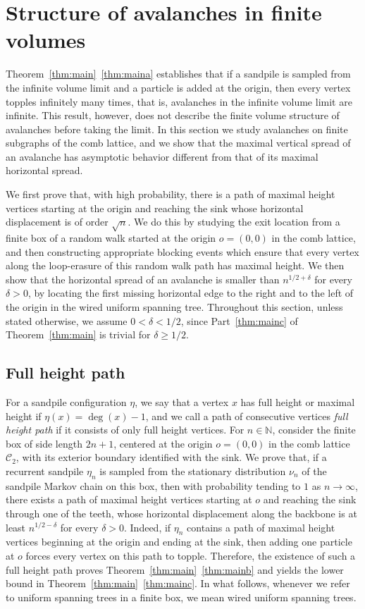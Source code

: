 \documentclass[11pt]{article}
\newcommand{\N}{\mathbb{N}}
\begin{document}
\section{Structure of avalanches in finite volumes}\label{sec:avalanche}

Theorem~\ref{thm:main}~\ref{thm:maina} establishes that if a sandpile is sampled from the infinite volume limit and a particle is added at the origin, then every vertex topples infinitely many times, that is, avalanches in the infinite volume limit are infinite. This result, however, does not describe the finite volume structure of avalanches before taking the limit. In this section we study avalanches on finite subgraphs of the comb lattice, and we show that the maximal vertical spread of an avalanche has asymptotic behavior different from that of its maximal horizontal spread.

We first prove that, with high probability, there is a path of maximal height vertices starting at the origin and reaching the sink whose horizontal displacement is of order $\sqrt{n}$. We do this by studying the exit location from a finite box of a random walk started at the origin $o=(0,0)$ in the comb lattice, and then constructing appropriate blocking events which ensure that every vertex along the loop-erasure of this random walk path has maximal height.
We then show that the horizontal spread of an avalanche is smaller than $n^{1/2+\delta}$ for every $\delta>0$, by locating the first missing horizontal edge to the right and to the left of the origin in the wired uniform spanning tree. Throughout this section, unless stated otherwise, we assume $0<\delta<1/2$, since Part~\ref{thm:mainc} of Theorem~\ref{thm:main} is trivial for $\delta\geq 1/2$.

\subsection{Full height path}\label{subsec:full-height}

For a sandpile configuration $\eta$, we say that a vertex $x$ has full height or maximal height if $\eta(x)=\deg(x)-1$, and we call a path of consecutive vertices \emph{full height path} if it consists of only full height vertices.
For $n\in \N$, consider the finite box of side length $2n+1$, centered at the origin $o=(0,0)$ in the comb lattice $\mathcal{C}_2$, with its exterior boundary identified with the sink. We prove that, if a recurrent sandpile $\eta_n$ is sampled from the stationary distribution $\nu_n$ of the sandpile Markov chain on this box, then with probability tending to $1$ as $n\to\infty$, there exists a path of maximal height vertices starting at $o$ and reaching the sink through one of the teeth, whose horizontal displacement along the backbone is at least $n^{1/2-\delta}$ for every $\delta>0$.
Indeed, if $\eta_n$ contains a path of maximal height vertices beginning at the origin and ending at the sink, then adding one particle at $o$ forces every vertex on this path to topple. Therefore, the existence of such a full height path proves Theorem~\ref{thm:main}~\ref{thm:mainb} and yields the lower bound in Theorem~\ref{thm:main}~\ref{thm:mainc}. In what follows, whenever we refer to uniform spanning trees in a finite box, we mean wired uniform spanning trees.
\end{document}
